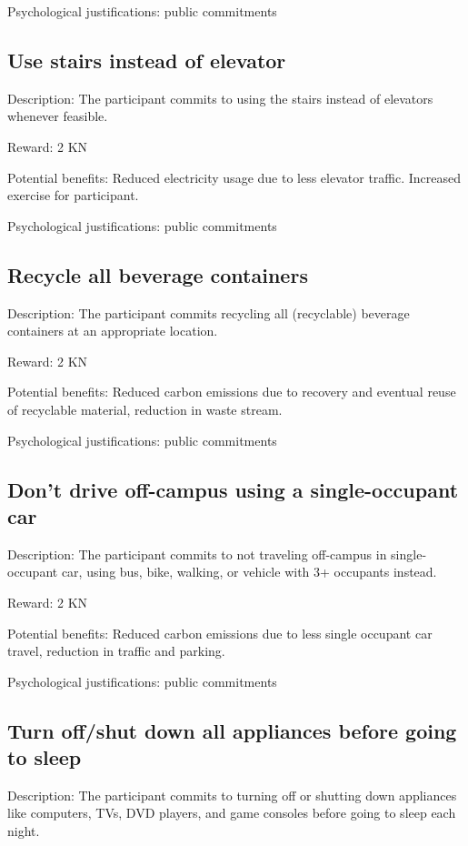 Psychological justifications: public commitments

\subsection{Use stairs instead of elevator}

Description: The participant commits to using the stairs instead of elevators whenever feasible.

Reward: 2 KN

Potential benefits: Reduced electricity usage due to less elevator traffic. Increased exercise for participant.

Psychological justifications: public commitments

\subsection{Recycle all beverage containers}

Description: The participant commits recycling all (recyclable) beverage containers at an appropriate location.

Reward: 2 KN

Potential benefits: Reduced carbon emissions due to recovery and eventual reuse of recyclable material, reduction in waste stream.

Psychological justifications: public commitments

\subsection{Don't drive off-campus using a single-occupant car}

Description: The participant commits to not traveling off-campus in single-occupant car, using bus, bike, walking, or vehicle with 3+ occupants instead.

Reward: 2 KN

Potential benefits: Reduced carbon emissions due to less single occupant car travel, reduction in traffic and parking.

Psychological justifications: public commitments

\subsection{Turn off/shut down all appliances before going to sleep}

Description: The participant commits to turning off or shutting down appliances like computers, TVs, DVD players, and game consoles before going to sleep each night.

